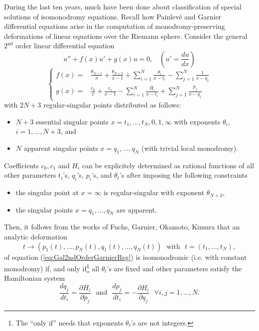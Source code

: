 \documentclass[12]{amsart}
\begin{document}
During the last ten years, much have been done about classification of special solutions of isomonodromy equations.
Recall how Painlev\'e and Garnier differential equations arise in the computation of monodromy-preserving 
deformations of linear 
equations over the Riemann sphere.  Consider the general $2^{\text{nd}}$ order linear differential equation 
\begin{equation}\label{eq:Gal2ndOrderGarnierReg}
u''+f(x)u'+g(x)u=0,\ \ \ \ (u'=\frac{du}{dx})
\end{equation}
$$\left\{\begin{matrix}
f(x)=&\frac{\theta_{N+1}}{x}+\frac{\theta_{N+2}}{x-1}+\sum_{i=1}^N\frac{\theta_i}{x-t_i}-\sum_{j=1}^N\frac{1}{x-q_j}\\
g(x)=&\frac{c_0}{x}+\frac{c_1}{x-1}-\sum_{i=1}^N\frac{H_i}{x-t_i}+\sum_{j=1}^N\frac{p_j}{x-q_j}
\end{matrix}\right.$$
with $2N+3$ regular-singular points distributed as follows:
\begin{itemize}
\item $N+3$ essential singular points $x=t_1,\ldots,t_N,0,1,\infty$ with exponents $\theta_i$, $i=1,\ldots,N+3$, and
\item $N$ apparent singular points $x=q_1,\ldots,q_N$ (with trivial local monodromy).
\end{itemize}
Coefficients $c_0,c_1$ and $H_i$ can be explicitely determined as rational functions of all other parameters
$t_i$'s, $q_i$'s, $p_i$'s, and $\theta_t$'s after imposing the following constraints
\begin{itemize}
\item the singular point at $x=\infty$ is regular-singular 
with exponent $\theta_{N+3}$, 
\item the singular points  $x=q_1,\ldots,q_N$ are apparent.
\end{itemize}
Then, it follows from the works of Fuchs, Garnier, Okamoto, Kimura that 
an analytic deformation 
$$t\to (p_1(t),\ldots,p_N(t),q_1(t),\ldots,q_N(t))\ \ \ \text{with}\ \ \ t=(t_1,\ldots,t_N),$$
of equation (\ref{eq:Gal2ndOrderGarnierReg})
is isomonodromic (i.e. with constant monodromy) if, 
and only if\footnote{The ``only if'' needs that exponents $\theta_t$'s are not integers.} 
all $\theta_t$'s are fixed and other parameters satisfy the Hamiltonian system
\begin{equation}\label{eq:HamiltonianGarnierSystem}
\frac{dq_j}{dt_i}=\frac{\partial H_i}{\partial p_j}\ \ \ \text{and}\ \ \ \frac{dp_j}{dt_i}=-\frac{\partial H_i}{\partial q_j}\ \ \ 
\forall i,j=1,\ldots,N.
\end{equation}
\end{document}
